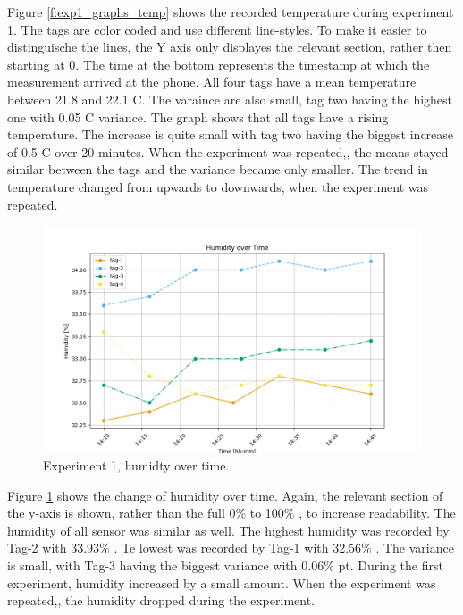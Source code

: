 Figure \ref{f:exp1_graphs_temp} shows the recorded temperature during experiment 1.
The tags are color coded and use different line-styles.
To make it easier to distinguische the lines, the Y axis only displayes the relevant section, rather then starting at 0\degree .
The time at the bottom represents the timestamp at which the measurement arrived at the phone.
All four tags have a mean temperature between 21.8 and 22.1 \degree C.
The varaince are also small, tag two having the highest one with 0.05 \degree C variance. 
The graph shows that all tags have a rising temperature.
The increase is quite small with tag two having the biggest increase of 0.5 \degree C over 20 minutes.
When the experiment was repeated,, the means stayed similar between the tags and the variance became only smaller.
The trend in temperature changed from upwards to downwards, when the experiment was repeated.

\begin{figure}[ht!]
	\includegraphics[width=\linewidth]{graphics/exp/exp1_hum_plot_0.png}
	\caption{Experiment 1, humidty over time.}
	\label{f:exp1_graphs_hum}
\end{figure}

Figure \ref{f:exp1_graphs_hum} shows the change of humidity over time.
Again, the relevant section of the y-axis is shown, rather than the full 0\% to 100\% , to increase readability.
The humidity of all sensor was similar as well.
The highest humidity was recorded by Tag-2 with 33.93\% .
Te lowest was recorded by Tag-1 with 32.56\% .
The variance is small, with Tag-3 having the biggest variance with 0.06\% pt.
During the first experiment, humidity increased by a small amount.
When the experiment was repeated,, the humidity dropped during the experiment.


